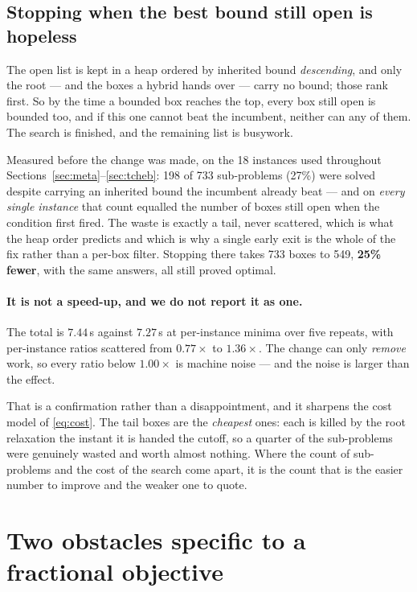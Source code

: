\documentclass[11pt,a4paper]{article}
\begin{document}
\subsection{Stopping when the best bound still open is hopeless}
\label{sec:exit}

The open list is kept in a heap ordered by inherited bound \emph{descending},
and only the root --- and the boxes a hybrid hands over --- carry no bound;
those rank first. So by the time a bounded box reaches the top, every box still
open is bounded too, and if this one cannot beat the incumbent, neither can any
of them. The search is finished, and the remaining list is busywork.

Measured before the change was made, on the 18 instances used throughout
Sections~\ref{sec:meta}--\ref{sec:tcheb}: 198 of 733 sub-problems (27\%) were
solved despite carrying an inherited bound the incumbent already beat --- and
on \emph{every single instance} that count equalled the number of boxes still
open when the condition first fired. The waste is exactly a tail, never
scattered, which is what the heap order predicts and which is why a single
early exit is the whole of the fix rather than a per-box filter. Stopping there
takes 733 boxes to 549, \textbf{25\% fewer}, with the same answers, all still
proved optimal.

\paragraph{It is not a speed-up, and we do not report it as one.} The total is
$7.44$\,s against $7.27$\,s at per-instance minima over five repeats, with
per-instance ratios scattered from $0.77\times$ to $1.36\times$. The change can
only \emph{remove} work, so every ratio below $1.00\times$ is machine noise ---
and the noise is larger than the effect.

That is a confirmation rather than a disappointment, and it sharpens the cost
model of \eqref{eq:cost}. The tail boxes are the \emph{cheapest} ones: each is
killed by the root relaxation the instant it is handed the cutoff, so a quarter
of the sub-problems were genuinely wasted and worth almost nothing. Where the
count of sub-problems and the cost of the search come apart, it is the count
that is the easier number to improve and the weaker one to quote.

\section{Two obstacles specific to a fractional objective}
\end{document}
